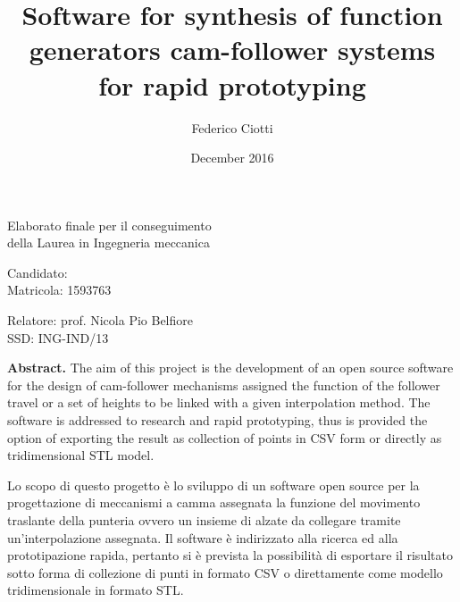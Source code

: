 \documentclass[a4paper,10pt,twoside]{article}
\title{Software for synthesis of function generators cam-follower systems for rapid prototyping}
\author{Federico Ciotti}
\date{December 2016}
\begin{document}
\lstset{language=Python}
\makeatletter
\begin{titlepage}
    \thispagestyle{first}

    \begin{center}
        \large{\textcolor{sapienza}{Elaborato finale per il conseguimento\\della Laurea in Ingegneria meccanica}}\par
        \vspace{1.2cm}
        {\Large\textbf{\@title}}\par
        \vspace{0.6cm}
        \begin{itshape}
        \large{Candidato: \@author
        \\Matricola: 1593763}\par
        \vspace{1cm}
        Relatore: prof. Nicola Pio Belfiore
        \\SSD: ING-IND/13\par
        \end{itshape}
        \vspace{1cm}
    \end{center}

    \textbf{Abstract.} The aim of this project is the development of an open source software for the design of cam-follower
    mechanisms assigned the function of the follower travel or a set of heights to be linked with a given interpolation method.
    The software is addressed to research and rapid prototyping, thus is provided the option of exporting the result as
    collection of points in CSV form or directly as tridimensional STL model.\par
    \bigskip
    Lo scopo di questo progetto è lo sviluppo di un software open source per la progettazione di meccanismi a camma
    assegnata la funzione del movimento traslante della punteria ovvero un insieme di alzate da collegare
    tramite un'interpolazione assegnata. Il software è indirizzato alla ricerca ed alla prototipazione rapida, pertanto si
    è prevista la possibilità di esportare il risultato sotto forma di collezione di punti in formato CSV o direttamente
    come modello tridimensionale in formato STL.
\end{titlepage}
\makeatother

\end{document}
